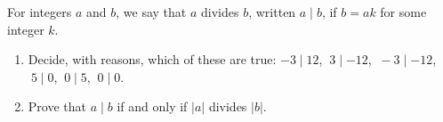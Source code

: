 For integers $a$ and $b$, we say that $a$ divides $b$, written $a\mid b$, if $b=ak$ for some integer $k$.
\begin{enumerate}
\item[(a)] Decide, with reasons, which of these are true: $-3\mid12$, $\ 3\mid-12$, $\ -3\mid-12$, $\ 5\mid0$, $\ 0\mid5$, $\ 0\mid0$.
\item[(b)] Prove that $a\mid b$ if and only if $|a|$ divides $|b|$.
\end{enumerate}
